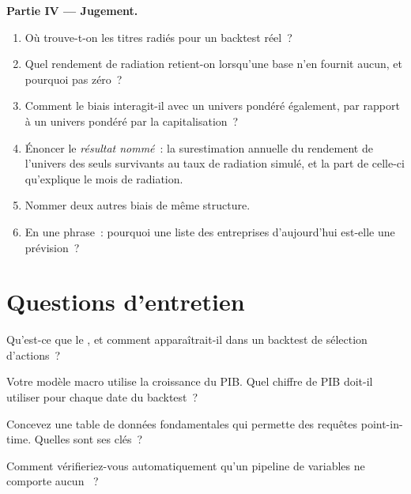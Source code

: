 \begin{problem}
\medskip\noindent\textbf{Partie IV --- Jugement.}
\begin{enumerate}[resume]
\item Où trouve-t-on les titres radiés pour un backtest réel~?
\item Quel rendement de radiation retient-on lorsqu'une base n'en fournit aucun, et pourquoi pas zéro~?
\item Comment le biais interagit-il avec un univers pondéré également, par rapport à un univers pondéré par la capitalisation~?
\item Énoncer le \emph{résultat nommé}~: la surestimation annuelle du rendement de l'univers des seuls survivants au taux de radiation simulé,
et la part de celle-ci qu'explique le mois de radiation.
\item Nommer deux autres biais de même structure.
\item En une phrase~: pourquoi une liste des entreprises d'aujourd'hui est-elle une prévision~?
\end{enumerate}
\end{problem}

\section{Questions d'entretien}

\begin{interviewq}\label{iq:rs:point-in-time-data-and-the-biases:1}
Qu'est-ce que le , et comment apparaîtrait-il dans un backtest de sélection d'actions~?
\end{interviewq}

\begin{interviewq}\label{iq:rs:point-in-time-data-and-the-biases:2}
Votre modèle macro utilise la croissance du PIB. Quel chiffre de PIB doit-il utiliser pour chaque date du backtest~?
\end{interviewq}

\begin{interviewq}\label{iq:rs:point-in-time-data-and-the-biases:3}
Concevez une table de données fondamentales qui permette des requêtes point-in-time. Quelles sont ses clés~?
\end{interviewq}

\begin{interviewq}\label{iq:rs:point-in-time-data-and-the-biases:4}
Comment vérifieriez-vous automatiquement qu'un pipeline de variables ne comporte aucun ~?
\end{interviewq}

